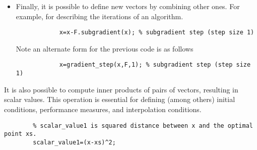 \documentclass[11pt,a4paper]{article}
\begin{document}
\begin{enumerate}
\begin{itemize}
			\item Finally, it is possible to define new vectors by combining other ones. For example, for describing the iterations of an algorithm.\\[-1cm]
			\begin{lstlisting}
			x=x-F.subgradient(x); % subgradient step (step size 1)
			\end{lstlisting}
			Note an alternate form for the previous code is as follows\\[-1cm]
			\begin{lstlisting}
			x=gradient_step(x,F,1); % subgradient step (step size 1)
			\end{lstlisting}
		\end{itemize}
		It is also possible to compute inner products of pairs of vectors, resulting in scalar values. This operation is essential for defining (among others) initial conditions, performance measures, and interpolation conditions.\\[-1cm]
		\begin{lstlisting}
		% scalar_value1 is squared distance between x and the optimal point xs.
		scalar_value1=(x-xs)^2; 
		

\end{lstlisting}
\end{enumerate}
\end{document}
